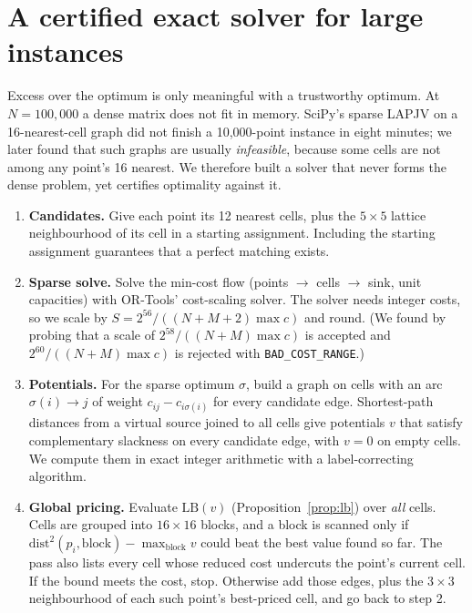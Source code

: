 \section{A certified exact solver for large instances}
\label{sec:exact}

Excess over the optimum is only meaningful with a trustworthy optimum. At
$N=100{,}000$ a dense matrix does not fit in memory. SciPy's sparse LAPJV on a
16-nearest-cell graph did not finish a 10{,}000-point instance in eight minutes; we
later found that such graphs are usually \emph{infeasible}, because some cells are not
among any point's 16 nearest. We therefore built a solver that never forms the dense
problem, yet certifies optimality against it.

\begin{enumerate}
\item \textbf{Candidates.} Give each point its 12 nearest cells, plus the $5\times5$
  lattice neighbourhood of its cell in a starting assignment. Including the starting
  assignment guarantees that a perfect matching exists.
\item \textbf{Sparse solve.} Solve the min-cost flow (points $\to$ cells $\to$ sink,
  unit capacities) with OR-Tools' cost-scaling solver. The solver needs integer costs,
  so we scale by $S=2^{56}/((N{+}M{+}2)\max c)$ and round.
  (We found by probing that a scale of $2^{58}/((N{+}M)\max c)$ is accepted and
  $2^{60}/((N{+}M)\max c)$ is rejected with \texttt{BAD\_COST\_RANGE}.)
\item \textbf{Potentials.} For the sparse optimum $\sigma$, build a graph on cells with
  an arc $\sigma(i)\to j$ of weight $c_{ij}-c_{i\sigma(i)}$ for every candidate edge.
  Shortest-path distances from a virtual source joined to all cells give potentials
  $v$ that satisfy complementary slackness on every candidate edge, with $v=0$ on empty
  cells. We compute them in exact integer arithmetic with a label-correcting algorithm.
\item \textbf{Global pricing.} Evaluate $\mathrm{LB}(v)$ (Proposition~\ref{prop:lb}) over
  \emph{all} cells. Cells are grouped into $16\times16$ blocks, and a block is scanned
  only if $\mathrm{dist}^2(p_i,\text{block})-\max_{\text{block}}v$ could beat the best
  value found so far. The pass also lists every cell whose reduced cost undercuts the
  point's current cell. If the bound meets the cost, stop. Otherwise add those edges,
  plus the $3\times3$ neighbourhood of each such point's best-priced cell, and go back
  to step 2.
\end{enumerate}


